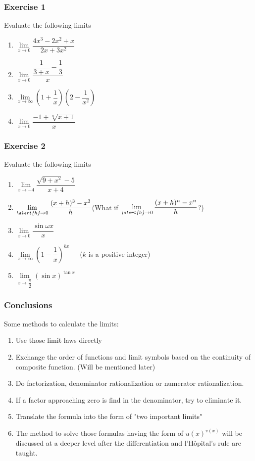 
	\begin{frame}
		\frametitle{Exercise 1}
		Evaluate the following limits\\
		\begin{enumerate}
			\item $\lim\limits_{\textit{x} \to 0}\dfrac{4x^{3}-2x^{2}+x}{2x+3x^{2}}$
			\item $\lim\limits_{\textit{x} \to 0}\dfrac{\dfrac{1}{3+x}-\dfrac{1}{3}}{x}$
			\item $\lim\limits_{\textit{x} \to \infty}(1+\dfrac{1}{x})(2-\dfrac{1}{x^{2}})$
			\item $\lim\limits_{\textit{x} \to 0}\dfrac{-1+\sqrt[n]{x+1}}{x}$

		\end{enumerate}
	\end{frame}
	\begin{frame}
		\frametitle{Exercise 2}
		Evaluate the following limits\\
		\begin{enumerate}
		    \item $\lim\limits_{\textit{x} \to -4}\dfrac{\sqrt{9+x^{2}}-5}{x+4}$
			\item $\lim\limits_{\textit{\alert{h}} \to 0}\dfrac{(x+h)^{3}-x^{3}}{h}$(What if $\lim\limits_{\textit{\alert{h}} \to 0}\dfrac{(x+h)^{n}-x^{n}}{h}$?)
			\item $\lim\limits_{\textit{x} \to 0}\dfrac{\sin{\omega x}}{x}$
			\item $\lim\limits_{\textit{x} \to \infty}(1-\dfrac{1}{x})^{kx}$\ \ \ ($k$ is a positive integer)
			\item $\lim\limits_{\textit{x} \to \dfrac{\pi}{2}}(\sin{x})^{\tan{x}}$
		\end{enumerate}
	\end{frame}
	\begin{frame}
		\frametitle{Conclusions}
		Some methods to calculate the limits:
		\begin{enumerate}
			\item Use those limit laws directly
			\item Exchange the order of functions and limit symbols based on the continuity of composite function. (Will be mentioned later)
			\item Do factorization, denominator rationalization or numerator rationalization.
			\item If a factor approaching zero is find in the denominator, try to eliminate it.
			\item Translate the formula into the form of "two important limits"
			\item \alert{The method to solve those formulas having the form of $u(x)^{v(x)}$ will be discussed at a deeper level after the differentiation and l'Hôpital's rule are taught.}
		\end{enumerate}
	\end{frame}
